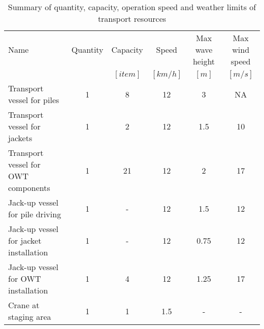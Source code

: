 \begin{table}
\label{tab:ressources}
\begin{tabular}{lccccc}
\hline 
Name & Quantity & Capacity & Speed & Max wave height & Max wind speed \\
& & $[item]$ & $[km/h]$ & $[m]$ & $[m/s]$ \\ 
\hline 
Transport vessel for piles & 1 & 8 & 12 & 3 & NA \\ 
Transport vessel for jackets & 1 & 2 & 12 & 1.5 & 10 \\ 
Transport vessel for OWT components & 1 & 21 & 12 & 2 & 17 \\ 
Jack-up vessel for pile driving & 1 & - & 12 & 1.5 & 12\\
Jack-up vessel for jacket installation & 1 & - & 12 & 0.75 & 12\\
Jack-up vessel for OWT installation & 1 & 4 & 12 & 1.25 & 17 \\
Crane at staging area & 1 & 1 & 1.5 & - & - \\
\hline 
\end{tabular}

\caption{Summary of quantity, capacity, operation speed and weather limits of transport resources}
\end{table}
